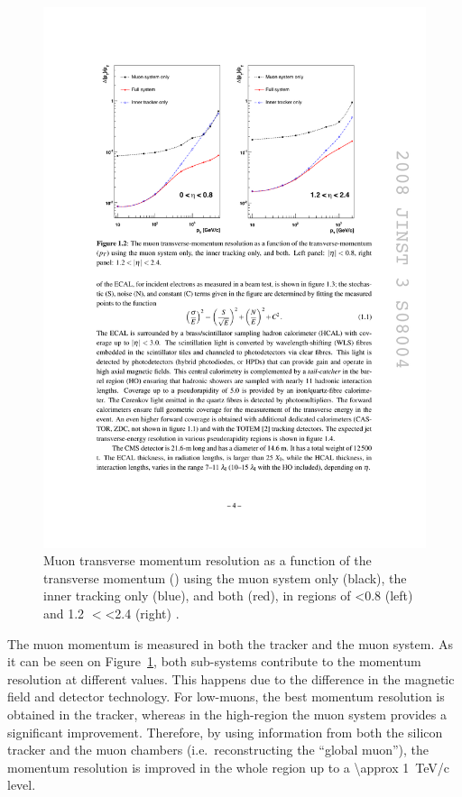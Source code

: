 \begin{figure}[htbp]
  \centering
  \leavevmode
  \includegraphics[width=\columnwidth]{muon_resolution}
  \caption[Muon transverse momentum resolution as a function of the transverse momentum]{Muon transverse momentum
  resolution as a function of the transverse momentum (\pt) using the muon system only (black), the inner tracking only
  (blue), and both (red), in regions of \abs\eta \num{<0.8} (left) and \num{1.2} $<$\abs\eta\num{<2.4} (right)
  \autocite{CMS}.}
  \label{fig:muon_resolution}
\end{figure}

The muon momentum is measured in both the tracker and the muon system.  As it can be seen on
Figure~\ref{fig:muon_resolution}, both sub-systems contribute to the momentum resolution at different \pt values. This
happens due to the difference in the magnetic field and detector technology. For low-\pt muons, the best momentum
resolution is obtained in the tracker, whereas in the high-\pt region the muon system provides a significant
improvement. Therefore, by using information from both the silicon tracker and the muon chambers (i.e.\ reconstructing
the ``global muon''), the momentum resolution is improved in the whole \pt region up to a \SI{\approx 1}{\TeV/c} level.

